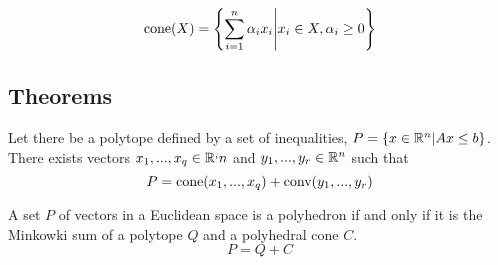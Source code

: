 \begin{definition}
\[
    \textrm{cone}(X) = \left\{ \sum_{i=1}^n \alpha_ix_i \middle| x_i\in X, \alpha_i \ge 0 \right \}
\]
\end{definition}

\subsection{Theorems}

\begin{theorem}
    Let there be a polytope defined by a set of inequalities, $P = \{ x\in\mathbb R^n | Ax\le b \}$. There exists vectors $x_1,...,x_q\in\mathbb R^,n$ and $y_1,...,y_r\in\mathbb R^n$ such that
    \[
        P = \textrm{cone}(x_1,...,x_q) + \textrm{conv}(y_1,...,y_r)
    \]
\end{theorem}

\begin{theorem}
    \label{th:decomposition_polyhedra}
    A set $P$ of vectors in a Euclidean space is a polyhedron if and only if it is the Minkowki sum of a polytope $Q$ and a polyhedral cone $C$. 
    \[
        P = Q + C
    \]
\end{theorem}